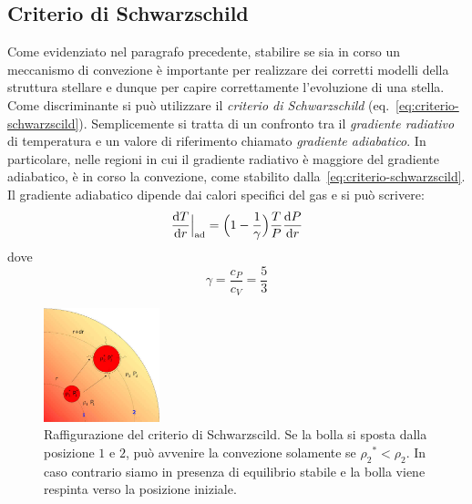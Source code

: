 \subsection{Criterio di Schwarzschild}
Come evidenziato nel paragrafo precedente, stabilire se sia in corso un meccanismo di convezione è importante per realizzare dei corretti modelli della struttura stellare e dunque per capire correttamente l'evoluzione di una stella. Come discriminante si può utilizzare il \emph{criterio di Schwarzschild} (eq.~\eqref{eq:criterio-schwarzscild}). Semplicemente si tratta di un confronto tra il \emph{gradiente radiativo} di temperatura e un valore di riferimento chiamato \emph{gradiente adiabatico}. In particolare, nelle regioni in cui il gradiente radiativo è maggiore del gradiente adiabatico, è in corso la convezione, come stabilito dalla~\eqref{eq:criterio-schwarzscild}. Il gradiente adiabatico dipende dai calori specifici del gas e si può scrivere:
\begin{equation}\label{eq:gradiente-adiabatico}
    \dfrac{\mathop{\mathrm{{}d}}\mathopen{} T}{\mathop{\mathrm{{}d}}\mathopen{} r}\Big|_\textup{ad} = \Bigl(1- \frac{1}{\gamma}\Bigr) \dfrac{T}{P} \dfrac{\mathop{\mathrm{{}d}}\mathopen{} P}{\mathop{\mathrm{{}d}}\mathopen{} r}
\end{equation}
dove
\[
\gamma =\frac{c_P}{c_V} = \frac{5}{3}
\]

\begin{figure}
\centering
\includegraphics[width=0.3\textwidth]{immagini/criterio-schwarzscild.jpg}
\caption{Raffigurazione del criterio di Schwarzscild. Se la bolla si sposta dalla posizione $1$ e $2$, può avvenire la convezione solamente se ${\rho_2}^* < \rho_2$. In caso contrario siamo in presenza di equilibrio stabile e la bolla viene respinta verso la posizione iniziale.}
\label{fig:criterio-schwarzscild}
\end{figure}

